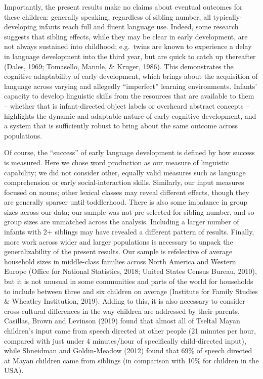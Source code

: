 \documentclass[
  english,
  man,floatsintext]{apa6}
\begin{document}
Importantly, the present results make no claims about eventual outcomes for these children: generally speaking, regardless of sibling number, all typically-developing infants reach full and fluent language use. Indeed, some research suggests that sibling effects, while they may be clear in early development, are not always sustained into childhood; e.g.~twins are known to experience a delay in language development into the third year, but are quick to catch up thereafter (Dales, 1969; Tomasello, Mannle, \& Kruger, 1986). This demonstrates the cognitive adaptability of early development, which brings about the acquisition of language across varying and allegedly \enquote{imperfect} learning environments. Infants' capacity to develop linguistic skills from the resources that are available to them -- whether that is infant-directed object labels or overheard abstract concepts -- highlights the dynamic and adaptable nature of early cognitive development, and a system that is sufficiently robust to bring about the same outcome across populations.

Of course, the \enquote{success} of early language development is defined by how success is measured. Here we chose word production as our measure of linguistic capability; we did not consider other, equally valid measures such as language comprehension or early social-interaction skills. Similarly, our input measures focused on nouns; other lexical classes may reveal different effects, though they are generally sparser until toddlerhood. There is also some imbalance in group sizes across our data; our sample was not pre-selected for sibling number, and so group sizes are unmatched across the analysis. Including a larger number of infants with 2+ siblings may have revealed a different pattern of results. Finally, more work across wider and larger populations is necessary to unpack the generalizability of the present results. Our sample is refelective of average household sizes in middle-class families across North America and Western Europe (Office for National Statistics, 2018; United States Census Bureau, 2010), but it is not unusual in some communities and parts of the world for households to include between three and six children on average (Institute for Family Studies \& Wheatley Institution, 2019). Adding to this, it is also necessary to consider cross-cultural differences in the way children are addressed by their parents. Casillas, Brown and Levinson (2019) found that almost all of Tseltal Mayan children's input came from speech directed at other people (21 minutes per hour, compared with just under 4 minutes/hour of specifically child-directed input), while Shneidman and Goldin-Meadow (2012) found that 69\% of speech directed at Mayan children came from siblings (in comparison with 10\% for children in the USA).
\end{document}
